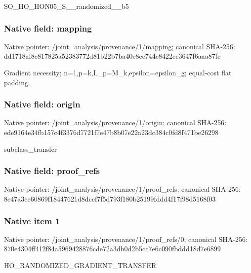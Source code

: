 \documentclass[10pt,a4paper]{article}
\begin{document}
\begingroup\raggedright\sloppy SO\_\allowbreak{}HO\_\allowbreak{}HON05\_\allowbreak{}S\_\allowbreak{}\_\allowbreak{}randomized\_\allowbreak{}\_\allowbreak{}b5\par\endgroup

\subsubsection{Native field: mapping}
Native pointer: /joint\_\allowbreak{}analysis/provenance/1/mapping; canonical SHA-256: dd1718af8c817825a52383772d81b22b7ba40c8ce744c8422cc3647f6aaa87fc

\begingroup\raggedright\sloppy Gradient necessity;\allowbreak{} n=\allowbreak{}1,\allowbreak{}p=\allowbreak{}k,\allowbreak{}L\_\allowbreak{}p=\allowbreak{}M\_\allowbreak{}k,\allowbreak{}epsilon=\allowbreak{}epsilon\_\allowbreak{}g;\allowbreak{} equal-cost flat padding.\par\endgroup

\subsubsection{Native field: origin}
Native pointer: /joint\_\allowbreak{}analysis/provenance/1/origin; canonical SHA-256: ede9164e34fb157c4f3376d7721f7e47b8b07e22a23dc384c0fd8f471be26298

\begingroup\raggedright\sloppy subclass\_\allowbreak{}transfer\par\endgroup

\subsubsection{Native field: proof\_\allowbreak{}refs}
Native pointer: /joint\_\allowbreak{}analysis/provenance/1/proof\_\allowbreak{}refs; canonical SHA-256: 8e47a3ee60869f18447621d8dccf7f5d793f180b25199fddd4f17f98d5168f03

\subsubsection{Native item 1}
Native pointer: /joint\_\allowbreak{}analysis/provenance/1/proof\_\allowbreak{}refs/0; canonical SHA-256: 870e4304ff412f84a5969428876cde72a3db0d2b5cc7e6c090fbddd18d7e6899

\begingroup\raggedright\sloppy HO\_\allowbreak{}RANDOMIZED\_\allowbreak{}GRADIENT\_\allowbreak{}TRANSFER\par\endgroup
\end{document}
